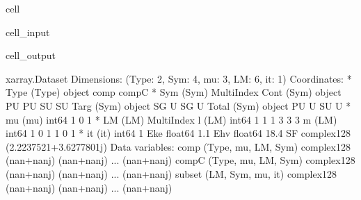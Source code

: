 \documentclass[letterpaper,table,10pt,english]{jupyterBook}
\begin{document}
\begin{sphinxuseclass}{cell}\begin{sphinxVerbatimInput}

\begin{sphinxuseclass}{cell_input}
\begin{sphinxVerbatim}[commandchars=\\\{\}]
\PYG{p}{[}\PYG{p}{]}\PYG{p}{[}\PYG{p}{]}
\end{sphinxVerbatim}

\end{sphinxuseclass}\end{sphinxVerbatimInput}
\begin{sphinxVerbatimOutput}

\begin{sphinxuseclass}{cell_output}
\begin{sphinxVerbatim}[commandchars=\\\{\}]
\PYGZlt{}xarray.Dataset\PYGZgt{}
Dimensions:  (Type: 2, Sym: 4, mu: 3, LM: 6, it: 1)
Coordinates:
  * Type     (Type) object \PYGZsq{}comp\PYGZsq{} \PYGZsq{}compC\PYGZsq{}
  * Sym      (Sym) MultiIndex
  \PYGZhy{} Cont     (Sym) object \PYGZsq{}PU\PYGZsq{} \PYGZsq{}PU\PYGZsq{} \PYGZsq{}SU\PYGZsq{} \PYGZsq{}SU\PYGZsq{}
  \PYGZhy{} Targ     (Sym) object \PYGZsq{}SG\PYGZsq{} \PYGZsq{}U\PYGZsq{} \PYGZsq{}SG\PYGZsq{} \PYGZsq{}U\PYGZsq{}
  \PYGZhy{} Total    (Sym) object \PYGZsq{}PU\PYGZsq{} \PYGZsq{}U\PYGZsq{} \PYGZsq{}SU\PYGZsq{} \PYGZsq{}U\PYGZsq{}
  * mu       (mu) int64 \PYGZhy{}1 0 1
  * LM       (LM) MultiIndex
  \PYGZhy{} l        (LM) int64 1 1 1 3 3 3
  \PYGZhy{} m        (LM) int64 \PYGZhy{}1 0 1 \PYGZhy{}1 0 1
  * it       (it) int64 1
    Eke      float64 1.1
    Ehv      float64 18.4
    SF       complex128 (2.2237521+3.6277801j)
Data variables:
    comp     (Type, mu, LM, Sym) complex128 (nan+nanj) (nan+nanj) ... (nan+nanj)
    compC    (Type, mu, LM, Sym) complex128 (nan+nanj) (nan+nanj) ... (nan+nanj)
    subset   (LM, Sym, mu, it) complex128 (nan+nanj) (nan+nanj) ... (nan+nanj)
\end{sphinxVerbatim}

\end{sphinxuseclass}\end{sphinxVerbatimOutput}

\end{sphinxuseclass}
\end{document}
